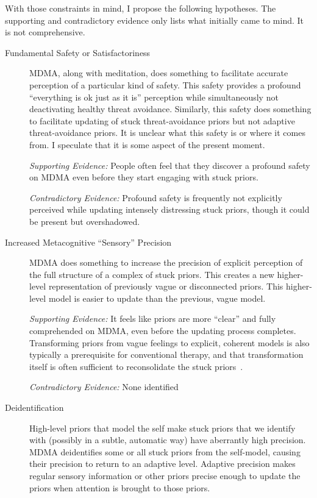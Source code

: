 \documentclass[11pt,oneside]{book}
\let\cite\parencite
\begin{document}
With those constraints in mind, I propose the following hypotheses. The supporting and contradictory evidence only lists what initially came to mind. It is not comprehensive.
\begin{description}
    \item[Fundamental Safety or Satisfactoriness] MDMA, along with meditation, does something to facilitate accurate perception of a particular kind of safety. This safety provides a profound \enquote{everything is ok just as it is} perception while simultaneously not deactivating healthy threat avoidance. Similarly, this safety does something to facilitate updating of stuck threat-avoidance priors but not adaptive threat-avoidance priors. It is unclear what this safety is or where it comes from. I speculate that it is some aspect of the present moment.
        
    \textit{Supporting Evidence:} People often feel that they discover a profound safety on MDMA even before they start engaging with stuck priors.

    \textit{Contradictory Evidence:} Profound safety is frequently not explicitly perceived while updating intensely distressing stuck priors, though it could be present but overshadowed.

    \item[Increased Metacognitive \enquote{Sensory} Precision] MDMA does something to increase the precision of explicit perception of the full structure of a complex of stuck priors. This creates a new higher-level representation of previously vague or disconnected priors. This higher-level model is easier to update than the previous, vague model.

    \textit{Supporting Evidence:} It feels like priors are more \enquote{clear} and fully comprehended on MDMA, even before the updating process completes. Transforming priors from vague feelings to explicit, coherent models is also typically a prerequisite for conventional therapy, and that transformation itself is often sufficient to reconsolidate the stuck priors~\cite{eckerUnlocking}.

    \textit{Contradictory Evidence:} None identified

    \item[Deidentification] High-level priors that model the self make stuck priors that we identify with (possibly in a subtle, automatic way) have aberrantly high precision. MDMA deidentifies some or all stuck priors from the self-model, causing their precision to return to an adaptive level. Adaptive precision makes regular sensory information or other priors precise enough to update the priors when attention is brought to those priors.
    

\end{description}
\end{document}
